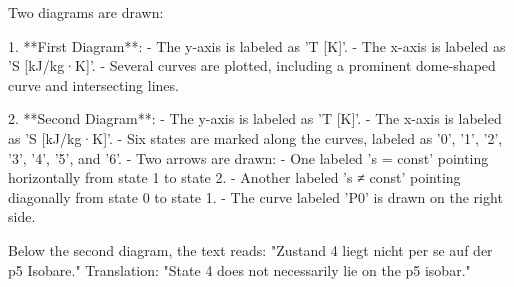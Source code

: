 Two diagrams are drawn:  

1. **First Diagram**:  
   - The y-axis is labeled as 'T [K]'.  
   - The x-axis is labeled as 'S [kJ/kg·K]'.  
   - Several curves are plotted, including a prominent dome-shaped curve and intersecting lines.  

2. **Second Diagram**:  
   - The y-axis is labeled as 'T [K]'.  
   - The x-axis is labeled as 'S [kJ/kg·K]'.  
   - Six states are marked along the curves, labeled as '0', '1', '2', '3', '4', '5', and '6'.  
   - Two arrows are drawn:  
     - One labeled 's = const' pointing horizontally from state 1 to state 2.  
     - Another labeled 's ≠ const' pointing diagonally from state 0 to state 1.  
   - The curve labeled 'P0' is drawn on the right side.  

Below the second diagram, the text reads:  
"Zustand 4 liegt nicht per se auf der p5 Isobare."  
Translation: "State 4 does not necessarily lie on the p5 isobar."
